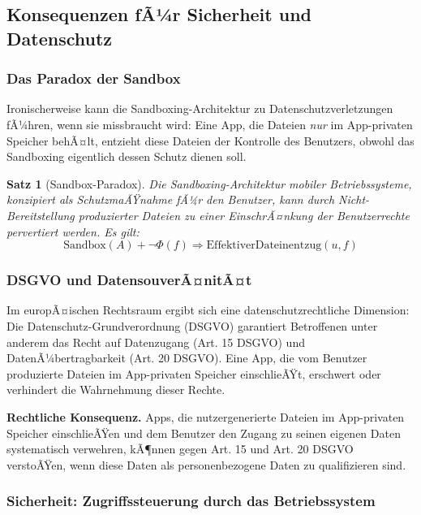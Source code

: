 ﻿\documentclass[12pt, a4paper]{article}
\newtheorem{satz}[definition]{Satz}
\begin{document}
\subsection{Konsequenzen fÃ¼r Sicherheit und Datenschutz}

\subsubsection{Das Paradox der Sandbox}

Ironischerweise kann die Sandboxing-Architektur zu Datenschutzverletzungen
fÃ¼hren, wenn sie missbraucht wird: Eine App, die Dateien \emph{nur} im
App-privaten Speicher behÃ¤lt, entzieht diese Dateien der Kontrolle des
Benutzers, obwohl das Sandboxing eigentlich dessen Schutz dienen soll.

\begin{satz}[Sandbox-Paradox]
Die Sandboxing-Architektur mobiler Betriebssysteme, konzipiert als SchutzmaÃŸnahme
fÃ¼r den Benutzer, kann durch Nicht-Bereitstellung produzierter Dateien zu einer
EinschrÃ¤nkung der Benutzerrechte pervertiert werden. Es gilt:
\[
  \text{Sandbox}(A) + \neg\Phi(f) \Rightarrow \text{EffektiverDateinentzug}(u, f)
\]
\end{satz}

\subsubsection{DSGVO und DatensouverÃ¤nitÃ¤t}

Im europÃ¤ischen Rechtsraum ergibt sich eine datenschutzrechtliche Dimension:
Die Daten\-schutz-Grundverordnung (DSGVO) garantiert Betroffenen unter anderem
das Recht auf Datenzugang (Art. 15 DSGVO) und DatenÃ¼bertragbarkeit (Art. 20 DSGVO).
Eine App, die vom Benutzer produzierte Dateien im App-privaten Speicher einschlieÃŸt,
erschwert oder verhindert die Wahrnehmung dieser Rechte.

\noindent\textbf{Rechtliche Konsequenz.} Apps, die nutzergenerierte Dateien im App-privaten Speicher einschlieÃŸen und
dem Benutzer den Zugang zu seinen eigenen Daten systematisch verwehren,
kÃ¶nnen gegen Art. 15 und Art. 20 DSGVO verstoÃŸen, wenn diese Daten als
personenbezogene Daten zu qualifizieren sind.

\subsubsection{Sicherheit: Zugriffssteuerung durch das Betriebssystem}
\end{document}
